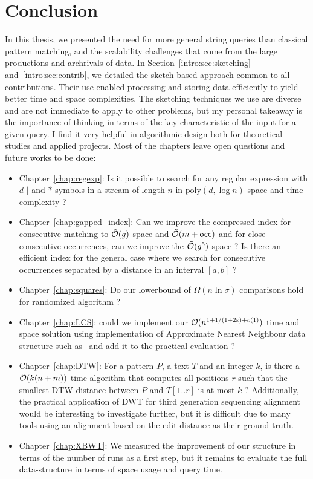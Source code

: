 \clearemptydoublepage
{}
\chapter*{Conclusion}
In this thesis, we presented the need for more general string queries than classical pattern matching, and the scalability challenges that come from the large productions and archrivals of data.
%
In Section~\ref*{intro:sec:sketching} and~\ref*{intro:sec:contrib}, we detailed the sketch-based approach common to all contributions. Their use enabled processing and storing data efficiently to yield better time and space complexities.
%
The sketching techniques we use are diverse and are not immediate to apply to other problems, but my personal takeaway is the importance of thinking in terms of the key characteristic of the input for a given query. I find it very helpful in algorithmic design both for theoretical studies and applied projects.
Most of the chapters leave open questions and future works to be done:
\begin{itemize}
    \item Chapter~\ref{chap:regexp}: Is it possible to search for any regular expression with $d$ $|$ and $\ast$ symbols in a stream of length $n$ in $\mathrm{poly}(d,\log n)$ space and time complexity ?
    \item Chapter~\ref{chap:gapped_index}: Can we improve the compressed index for consecutive matching to $\tilde{\mathcal{O}}(g)$ space and $\tilde{\mathcal{O}}(m+\mathsf{occ})$ and for close consecutive occurrences, can we improve the $\tilde{\mathcal{O}}(g^5)$ space ? Is there an efficient index for the general case where we search for consecutive occurrences separated by a distance in an interval $[a,b]$ ?
    \item Chapter~\ref{chap:squares}: Do our lowerbound of $\Omega(n\ln \sigma)$ comparisons hold for randomized algorithm ?
    \item Chapter~\ref{chap:LCS}: could we implement our $\mathcal{O}(n^{1+ 1/(1+2\varepsilon) + o(1)})$ time and space solution using implementation of Approximate Nearest Neighbour data structure such as~\cite{} and add it to the practical evaluation ?
    \item Chapter~\ref{chap:DTW}: For a pattern $P$, a text $T$ and an integer $k$, is there a $\mathcal{O}(k(n+m))$ time algorithm that computes all positions $r$ such that the smallest DTW distance between $P$ and $T[1..r]$ is at most $k$ ? Additionally, the practical application of DWT for third generation sequencing alignment would be interesting to investigate further, but it is difficult due to many tools using an alignment based on the edit distance as their ground truth.    
    \item Chapter~\ref{chap:XBWT}: We measured the improvement of our structure in terms of the number of runs as a first step, but it remains to evaluate the full data-structure in terms of space usage and query time.
\end{itemize}
